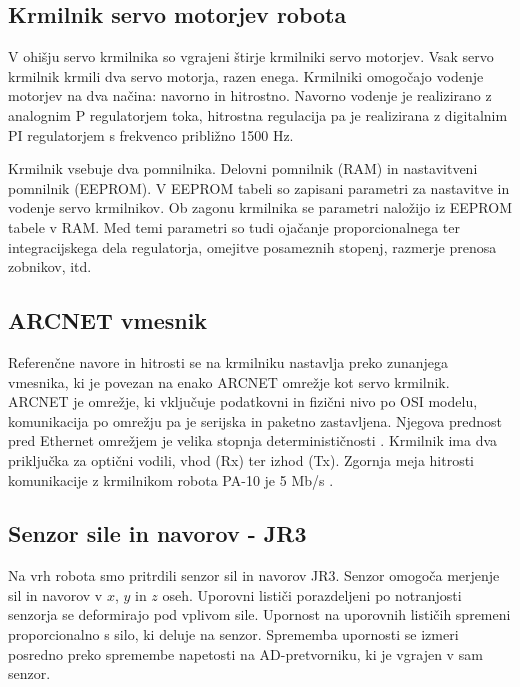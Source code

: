 \documentclass[a4paper]{article}
\begin{document}
\subsection{Krmilnik servo motorjev robota} \label{sec:servo-drive}

V ohišju servo krmilnika so vgrajeni štirje krmilniki servo motorjev. Vsak servo krmilnik krmili dva servo motorja, razen enega. Krmilniki omogočajo vodenje motorjev na dva načina: navorno in hitrostno. Navorno vodenje je realizirano z analognim P regulatorjem toka, hitrostna regulacija pa je realizirana z digitalnim PI regulatorjem s frekvenco približno 1500 Hz.

Krmilnik vsebuje dva pomnilnika. Delovni pomnilnik (RAM) in nastavitveni pomnilnik (EEPROM). V EEPROM tabeli so zapisani parametri za nastavitve in vodenje servo krmilnikov. Ob zagonu krmilnika se parametri naložijo iz EEPROM tabele v RAM. Med temi parametri so tudi ojačanje proporcionalnega ter integracijskega dela regulatorja, omejitve posameznih stopenj, razmerje prenosa zobnikov, itd.

\subsection{ARCNET vmesnik}\label{sec:arc_drive}

Referenčne navore in hitrosti se na krmilniku nastavlja preko zunanjega vmesnika, ki je povezan na enako ARCNET omrežje kot servo krmilnik. ARCNET je omrežje, ki vključuje podatkovni in fizični nivo po OSI modelu, komunikacija po omrežju pa je serijska in paketno zastavljena. Njegova prednost pred Ethernet omrežjem je velika stopnja determinističnosti \cite{arc_tutorial}. Krmilnik ima dva priključka za optični 
vodili, vhod (Rx) ter izhod (Tx). Zgornja meja hitrosti komunikacije z krmilnikom robota PA-10 je 5 Mb/s \cite{pa10-manual}.

\subsection{Senzor sile in navorov - JR3}	

Na vrh robota smo pritrdili senzor sil in navorov JR3. Senzor omogoča merjenje sil in navorov v $x$, $y$ in $z$ oseh. Uporovni lističi porazdeljeni po notranjosti senzorja se deformirajo pod vplivom sile. Upornost na uporovnih lističih spremeni proporcionalno s silo, ki deluje na senzor. Sprememba upornosti se izmeri posredno preko spreme\-mbe napetosti na AD-pretvorniku, ki je vgrajen v sam senzor. 
\end{document}
